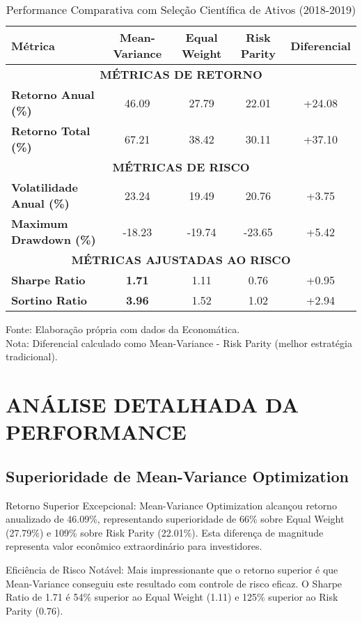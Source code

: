 \begin{table}[H]
\centering
\caption{Performance Comparativa com Seleção Científica de Ativos (2018-2019)}
\begin{tabular}{|l|c|c|c|c|}
\hline
\textbf{Métrica} & \textbf{Mean-Variance} & \textbf{Equal Weight} & \textbf{Risk Parity} & \textbf{Diferencial} \\
\hline
\multicolumn{5}{|c|}{\textbf{MÉTRICAS DE RETORNO}} \\
\hline
\textbf{Retorno Anual (\%)} & 46.09 & 27.79 & 22.01 & +24.08 \\
\textbf{Retorno Total (\%)} & 67.21 & 38.42 & 30.11 & +37.10 \\
\hline
\multicolumn{5}{|c|}{\textbf{MÉTRICAS DE RISCO}} \\
\hline
\textbf{Volatilidade Anual (\%)} & 23.24 & 19.49 & 20.76 & +3.75 \\
\textbf{Maximum Drawdown (\%)} & -18.23 & -19.74 & -23.65 & +5.42 \\
\hline
\multicolumn{5}{|c|}{\textbf{MÉTRICAS AJUSTADAS AO RISCO}} \\
\hline
\textbf{Sharpe Ratio} & \textbf{1.71} & 1.11 & 0.76 & +0.95 \\
\textbf{Sortino Ratio} & \textbf{3.96} & 1.52 & 1.02 & +2.94 \\
\hline
\end{tabular}
\label{tab:performance_comparativa_cientifica}
\footnotesize
Fonte: Elaboração própria com dados da Economática.\\
Nota: Diferencial calculado como Mean-Variance - Risk Parity (melhor estratégia tradicional).
\end{table}

\section{ANÁLISE DETALHADA DA PERFORMANCE}

\subsection{Superioridade de Mean-Variance Optimization}

Retorno Superior Excepcional: Mean-Variance Optimization alcançou retorno anualizado de 46.09\%, representando superioridade de 66\% sobre Equal Weight (27.79\%) e 109\% sobre Risk Parity (22.01\%). Esta diferença de magnitude representa valor econômico extraordinário para investidores.

Eficiência de Risco Notável: Mais impressionante que o retorno superior é que Mean-Variance conseguiu este resultado com controle de risco eficaz. O Sharpe Ratio de 1.71 é 54\% superior ao Equal Weight (1.11) e 125\% superior ao Risk Parity (0.76).

